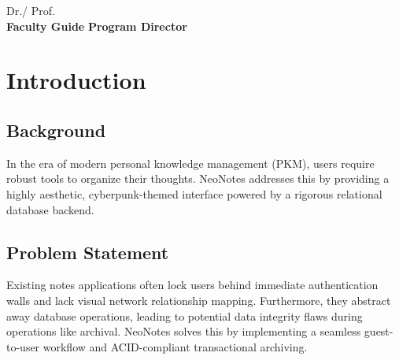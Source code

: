 \documentclass[12pt,a4paper]{report}
\begin{document}
\vspace{3cm}
\noindent Dr./ Prof. \underline{\hspace{4cm}} \hfill \underline{\hspace{4cm}} \\
\noindent \textbf{Faculty Guide} \hfill \textbf{Program Director}

\newpage
\begin{abstract}
\noindent \textbf{Problem Statement:} Traditional note-taking applications often lack immersive visual organization and fail to provide a seamless transition from transient guest sessions to authenticated user accounts. \\
\textbf{Objectives:} To build a secure, ACID-compliant database application that supports complex Markdown rendering, dynamic tagging, seamless guest-to-user session transfer, and an interactive 3D network topology visualization.\\
\textbf{Methodology:} Developed a monolithic full-stack web application using Flask, anchored by a fully normalized MySQL database utilizing SQLAlchemy ORM and raw SQL executions. \\
\textbf{Tools used:} Python, Flask, MySQL, SQLAlchemy, Vanilla JS, Marked.js. \\
\textbf{Key outcomes:} Successfully implemented an advanced DBMS project featuring Views, Triggers, Stored Procedures, and explicitly locked ACID Transactions ensuring absolute data integrity.
\end{abstract}

\tableofcontents

\chapter{Introduction}
\section{Background}
In the era of modern personal knowledge management (PKM), users require robust tools to organize their thoughts. NeoNotes addresses this by providing a highly aesthetic, cyberpunk-themed interface powered by a rigorous relational database backend.

\section{Problem Statement}
Existing notes applications often lock users behind immediate authentication walls and lack visual network relationship mapping. Furthermore, they abstract away database operations, leading to potential data integrity flaws during operations like archival. NeoNotes solves this by implementing a seamless guest-to-user workflow and ACID-compliant transactional archiving.
\end{document}
